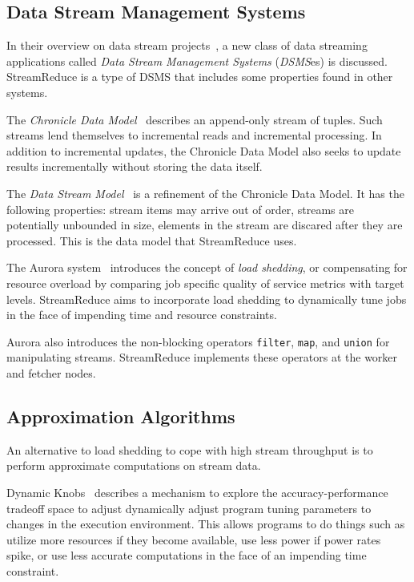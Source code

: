 \documentclass[12pt,twocolumn]{article}
\begin{document}
\subsection{Data Stream Management Systems}
In their overview on data stream projects~\cite{Babcock:2002:MID:543613.543615},
a new class of data streaming applications
called \emph{Data Stream Management Systems} (\emph{DSMS}es) is discussed.
StreamReduce is a type of DSMS that includes some properties found in other systems.

The \emph{Chronicle Data Model}~\cite{Jagadish:1995:VMI:212433.220201} describes an
append-only stream of tuples. Such
streams lend themselves to incremental reads and incremental processing. In addition to incremental
updates, the Chronicle Data Model also seeks to update results incrementally without storing the
data itself.

The \emph{Data Stream Model}~\cite{Babcock:2002:MID:543613.543615} is a refinement of the Chronicle
Data Model. It has the following properties: stream items may arrive out of order,
streams are potentially unbounded in size, elements in the stream are discared after they are
processed. This is the data model that StreamReduce uses.

The Aurora system~\cite{Carney:2002:MSN:1287369.1287389} introduces the concept of
\emph{load shedding}, or compensating for
resource overload by comparing job specific quality of service metrics with target levels.
StreamReduce aims to incorporate load shedding to dynamically tune jobs in the face of
impending time and resource constraints.

Aurora also introduces the non-blocking operators
\texttt{filter}, \texttt{map}, and \texttt{union} for
manipulating streams. StreamReduce implements these operators at the worker and fetcher nodes.

\subsection{Approximation Algorithms}
An alternative to load shedding to cope with high stream throughput is to perform approximate
computations on stream data.

Dynamic Knobs~\cite{Hoffmann:2011:DKR:1950365.1950390} describes a mechanism to explore the
accuracy-performance tradeoff space to adjust dynamically adjust program tuning parameters
to changes in the execution environment. This allows programs to do things such as
utilize more resources if they become available, use less power if power rates spike,
or use less accurate computations in the face of an impending time constraint.
\end{document}
